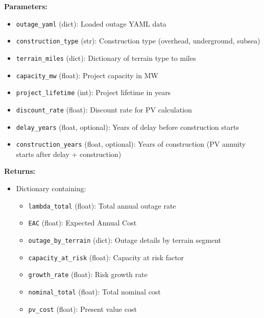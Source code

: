 \documentclass[ctcc_full_documentation.tex]{subfiles}
\begin{document}
\textbf{Parameters:}
\begin{itemize}
    \item \texttt{outage\_yaml} (dict): Loaded outage YAML data
    \item \texttt{construction\_type} (str): Construction type (overhead, underground, subsea)
    \item \texttt{terrain\_miles} (dict): Dictionary of terrain type to miles
    \item \texttt{capacity\_mw} (float): Project capacity in MW
    \item \texttt{project\_lifetime} (int): Project lifetime in years
    \item \texttt{discount\_rate} (float): Discount rate for PV calculation
    \item \texttt{delay\_years} (float, optional): Years of delay before construction starts
    \item \texttt{construction\_years} (float, optional): Years of construction (PV annuity starts after delay + construction)
\end{itemize}

\textbf{Returns:}
\begin{itemize}
    \item Dictionary containing:
    \begin{itemize}
        \item \texttt{lambda\_total} (float): Total annual outage rate
        \item \texttt{EAC} (float): Expected Annual Cost
        \item \texttt{outage\_by\_terrain} (dict): Outage details by terrain segment
        \item \texttt{capacity\_at\_risk} (float): Capacity at risk factor
        \item \texttt{growth\_rate} (float): Risk growth rate
        \item \texttt{nominal\_total} (float): Total nominal cost
        \item \texttt{pv\_cost} (float): Present value cost
    \end{itemize}
\end{itemize}
\end{document}
